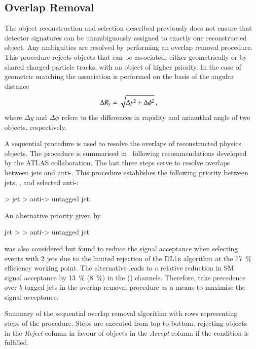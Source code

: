 \subsection{Overlap Removal}%
\label{sec:overlap_removal}

The object reconstruction and selection described previously does not ensure
that detector signatures can be unambiguously assigned to exactly one
reconstructed object. Any ambiguities are resolved by performing an overlap
removal procedure. This procedure rejects objects that can be associated, either
geometrically or by shared charged-particle tracks, with an object of higher
priority. In the case of geometric matching the association is performed on the
basis of the angular distance
\begin{align*}
  \Delta R_y = \sqrt{\Delta y^2 + \Delta \phi^2} \,\text{,}
\end{align*}
where $\Delta y$ and $\Delta \phi$ refers to the differences in rapidity and
azimuthal angle of two objects, respectively.

A sequential procedure is used to resolve the overlaps of reconstructed physics
objects. The procedure is summarised in~ following
recommendations developed by the ATLAS collaboration. The last three steps serve
to resolve overlaps between jets and anti-\tauhadvis. This procedure establishes
the following priority between jets, \tauhadvis, and selected anti-\tauhadvis:
\begin{center}
  \tauhadvis > \btagged jet > anti-\tauhadvis > untagged jet.
\end{center}
An alternative priority given by
\begin{center}
  \btagged jet > \tauhadvis > anti-\tauhadvis > untagged jet
\end{center}
was also considered but found to reduce the signal acceptance when selecting
events with 2 \btagged jets due to the limited \tauhadvis rejection of the
\textsc{DL1r} \btag algorithm at the \SI{77}{\percent} efficiency working
point. The alternative leads to a relative reduction in SM \HH signal acceptance
by \SI{13}{\percent} (\SI{8}{\percent}) in the \hadhad (\lephad)
channels. Therefore, \tauhadvis take precedence over $b$-tagged jets in the
overlap removal procedure as a means to maximise the signal acceptance.

\begin{table}[htbp]
  \centering


  \caption[Summary of the sequential overlap removal algorithm.]{Summary of the
    sequential overlap removal algorithm with rows representing steps of the
    procedure. Steps are executed from top to bottom, rejecting objects in the
    \emph{Reject} column in favour of objects in the \emph{Accept} column if the
    condition is fulfilled.}%
  \label{tab:overlap_removal}

  \resizebox{\textwidth}{!}{%
    
  }
\end{table}


